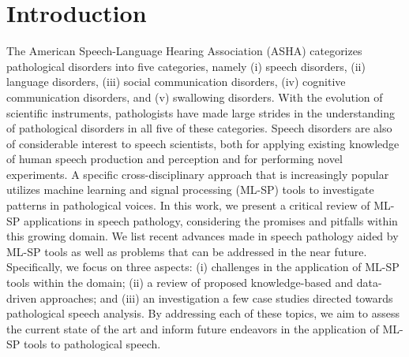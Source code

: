 \documentclass{article}
\begin{document}
\section{Introduction}
\label{sec:intro}
The American Speech-Language Hearing Association (ASHA) \cite{american2008council} categorizes pathological disorders into five categories, namely (i) speech disorders, (ii) language disorders, (iii) social communication disorders, (iv) cognitive communication disorders, and (v) swallowing disorders. With the evolution of scientific instruments, pathologists have made large strides in the understanding of pathological disorders in all five of these categories. Speech disorders are also of considerable interest to speech scientists, both for applying existing knowledge of human speech production and perception and for performing novel experiments. A specific cross-disciplinary approach that is increasingly popular utilizes machine learning and signal processing (ML-SP) tools to investigate patterns in pathological voices. In this work, we present a critical review of ML-SP applications in speech pathology, considering the promises and pitfalls within this growing domain. 
We list recent advances made in speech pathology aided by ML-SP tools as well as problems that can be addressed in the near future. 
Specifically, we focus on three aspects: (i) challenges in the application of ML-SP tools within the domain; (ii) a review of proposed knowledge-based and data-driven approaches; and (iii) an investigation a few case studies directed towards pathological speech analysis.
By addressing each of these topics, we aim to assess the current state of the art and inform future endeavors in the application of ML-SP tools to pathological speech. 
\end{document}
